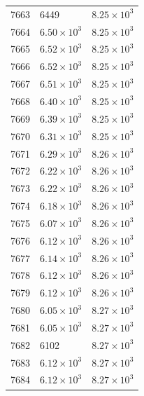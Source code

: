 \begin{table}[H]
\begin{tabular}{lll}
7663 & 6449 & $\displaystyle 8.25 \times 10^{3}$ \\
7664 & $\displaystyle 6.50 \times 10^{3}$ & $\displaystyle 8.25 \times 10^{3}$ \\
7665 & $\displaystyle 6.52 \times 10^{3}$ & $\displaystyle 8.25 \times 10^{3}$ \\
7666 & $\displaystyle 6.52 \times 10^{3}$ & $\displaystyle 8.25 \times 10^{3}$ \\
7667 & $\displaystyle 6.51 \times 10^{3}$ & $\displaystyle 8.25 \times 10^{3}$ \\
7668 & $\displaystyle 6.40 \times 10^{3}$ & $\displaystyle 8.25 \times 10^{3}$ \\
7669 & $\displaystyle 6.39 \times 10^{3}$ & $\displaystyle 8.25 \times 10^{3}$ \\
7670 & $\displaystyle 6.31 \times 10^{3}$ & $\displaystyle 8.25 \times 10^{3}$ \\
7671 & $\displaystyle 6.29 \times 10^{3}$ & $\displaystyle 8.26 \times 10^{3}$ \\
7672 & $\displaystyle 6.22 \times 10^{3}$ & $\displaystyle 8.26 \times 10^{3}$ \\
7673 & $\displaystyle 6.22 \times 10^{3}$ & $\displaystyle 8.26 \times 10^{3}$ \\
7674 & $\displaystyle 6.18 \times 10^{3}$ & $\displaystyle 8.26 \times 10^{3}$ \\
7675 & $\displaystyle 6.07 \times 10^{3}$ & $\displaystyle 8.26 \times 10^{3}$ \\
7676 & $\displaystyle 6.12 \times 10^{3}$ & $\displaystyle 8.26 \times 10^{3}$ \\
7677 & $\displaystyle 6.14 \times 10^{3}$ & $\displaystyle 8.26 \times 10^{3}$ \\
7678 & $\displaystyle 6.12 \times 10^{3}$ & $\displaystyle 8.26 \times 10^{3}$ \\
7679 & $\displaystyle 6.12 \times 10^{3}$ & $\displaystyle 8.26 \times 10^{3}$ \\
7680 & $\displaystyle 6.05 \times 10^{3}$ & $\displaystyle 8.27 \times 10^{3}$ \\
7681 & $\displaystyle 6.05 \times 10^{3}$ & $\displaystyle 8.27 \times 10^{3}$ \\
7682 & 6102 & $\displaystyle 8.27 \times 10^{3}$ \\
7683 & $\displaystyle 6.12 \times 10^{3}$ & $\displaystyle 8.27 \times 10^{3}$ \\
7684 & $\displaystyle 6.12 \times 10^{3}$ & $\displaystyle 8.27 \times 10^{3}$ \\

\end{tabular}
\end{table}
